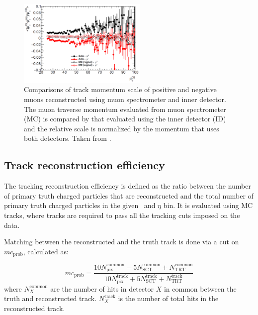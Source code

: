\begin{figure}[h]
\centering
\includegraphics[width=0.55\textwidth]{figures/main/corrections/MuonPerf.pdf}
\caption{Comparisons of track momentum scale of positive and negative muons reconstructed using muon spectrometer and inner detector.
The muon traverse momentum evaluated from muon spectrometer (MC) is compared by that evaluated using the inner detector (ID) and the relative scale is normalized by the momentum that uses both detectors.
Taken from \cite{Bold:2194917}.}
\label{fig:ChMomentumScale}
\end{figure}


\subsection{Track reconstruction efficiency}
\label{sec:trackreco}

The tracking reconstruction efficiency is defined as the ratio between the number of primary truth charged particles that are reconstructed and the total number of primary truth charged particles in the given \pt\ and $\eta$ bin.
It is evaluated using MC tracks, where tracks are required to pass all the tracking cuts imposed on the data.

Matching between the reconstructed and the truth track is done via a cut on $mc_{\mathrm{prob}}$, calculated as:

\begin{equation}
mc_{\mathrm{prob}} = \frac{10N^{\mathrm{common}}_{\mathrm{pix}} + 5N^{\mathrm{common}}_{\mathrm{SCT}} + N^{\mathrm{common}}_{\mathrm{TRT}}}{10N^{\mathrm{track}}_{\mathrm{pix}} + 5 N^{\mathrm{track}}_{\mathrm{SCT}} + N^{\mathrm{track}}_{\mathrm{TRT}}
\label{eq:mc_prob}}
\end{equation}
where $N^{\mathrm{common}}_X$  are the number of hits in detector $X$ in common between the truth and reconstructed track.
$N^{\mathrm{track}}_X$ is the number of total hits in the reconstructed track.

